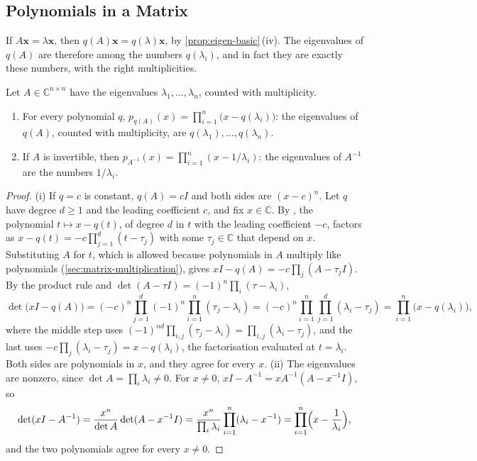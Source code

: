 \subsection{Polynomials in a Matrix}

If $A\mathbf x=\lambda\mathbf x$, then $q(A)\mathbf x=q(\lambda)\mathbf x$, by \cref{prop:eigen-basic}\,(iv). The eigenvalues of $q(A)$ are therefore among the numbers $q(\lambda_i)$, and in fact they are exactly these numbers, with the right multiplicities.

\begin{theorem}
\label{thm:spectral-mapping}
Let $A\in\mathbb C^{n\times n}$ have the eigenvalues $\lambda_1,\ldots,\lambda_n$, counted with multiplicity.
\begin{enumerate}
\item For every polynomial $q$, $p_{q(A)}(x)=\prod_{i=1}^n\bigl(x-q(\lambda_i)\bigr)$: the eigenvalues of $q(A)$, counted with multiplicity, are $q(\lambda_1),\ldots,q(\lambda_n)$.
\item If $A$ is invertible, then $p_{A^{-1}}(x)=\prod_{i=1}^n(x-1/\lambda_i)$: the eigenvalues of $A^{-1}$ are the numbers $1/\lambda_i$.
\end{enumerate}
\end{theorem}

\begin{proof}
(i) If $q=c$ is constant, $q(A)=cI$ and both sides are $(x-c)^n$. Let $q$ have degree $d\ge1$ and the leading coefficient $c$, and fix $x\in\mathbb C$. By , the polynomial $t\mapsto x-q(t)$, of degree $d$ in $t$ with the leading coefficient $-c$, factors as $x-q(t)=-c\prod_{j=1}^d(t-\tau_j)$ with some $\tau_j\in\mathbb C$ that depend on $x$. Substituting $A$ for $t$, which is allowed because polynomials in $A$ multiply like polynomials (\cref{sec:matrix-multiplication}), gives $xI-q(A)=-c\prod_j(A-\tau_jI)$. By the product rule and $\det(A-\tau I)=(-1)^n\prod_i(\tau-\lambda_i)$,
\[
\det\bigl(xI-q(A)\bigr)=(-c)^n\prod_{j=1}^d(-1)^n\prod_{i=1}^n(\tau_j-\lambda_i)=(-c)^n\prod_{i=1}^n\prod_{j=1}^d(\lambda_i-\tau_j)=\prod_{i=1}^n\bigl(x-q(\lambda_i)\bigr),
\]
where the middle step uses $(-1)^{nd}\prod_{i,j}(\tau_j-\lambda_i)=\prod_{i,j}(\lambda_i-\tau_j)$, and the last uses $-c\prod_j(\lambda_i-\tau_j)=x-q(\lambda_i)$, the factorisation evaluated at $t=\lambda_i$. Both sides are polynomials in $x$, and they agree for every $x$. (ii) The eigenvalues are nonzero, since $\det A=\prod_i\lambda_i\ne0$. For $x\ne0$, $xI-A^{-1}=xA^{-1}(A-x^{-1}I)$, so
\[
\det(xI-A^{-1})=\frac{x^n}{\det A}\det(A-x^{-1}I)=\frac{x^n}{\prod_i\lambda_i}\prod_{i=1}^n(\lambda_i-x^{-1})=\prod_{i=1}^n\Bigl(x-\frac1{\lambda_i}\Bigr),
\]
and the two polynomials agree for every $x\ne0$.
\end{proof}

